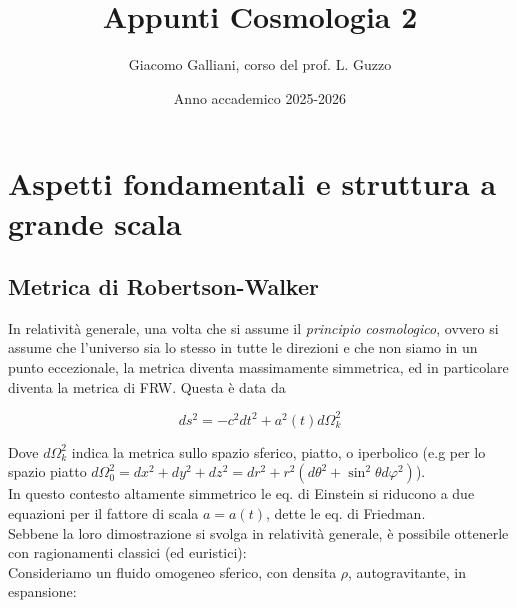 \documentclass{report}
\title{\Huge\textbf{{Appunti Cosmologia 2}}}
\author{Giacomo Galliani, corso del prof. L. Guzzo}
\date{Anno accademico 2025-2026}
\renewcommand{\contentsname}{Indice}
\begin{document}
\maketitle
\newpage%
\pdfbookmark[section]{\contentsname}{toc}
\tableofcontents
\pagebreak

\chapter{Aspetti fondamentali e struttura a grande scala}

\section{Metrica di Robertson-Walker}

In relatività generale, una volta che si assume il \emph{principio cosmologico}, ovvero si assume che l'universo sia lo stesso in tutte le direzioni e che non siamo in un punto eccezionale, la metrica diventa massimamente simmetrica, ed in particolare diventa la metrica di FRW. Questa è data da 

\begin{equation}
    ds^2 = -c^2dt^2 + a^2(t)d\Omega_k^2
\end{equation}

Dove $d\Omega_k^2$ indica la metrica sullo spazio sferico, piatto, o iperbolico (e.g per lo spazio piatto $d\Omega_0^2= dx^2 + dy^2 + dz^2 = dr^2 + r^2(d\theta^2 + \sin^2\theta d\varphi^2)$). \\
In questo contesto altamente simmetrico le eq. di Einstein si riducono a due equazioni per il fattore di scala $a = a(t)$, dette le eq. di Friedman. \\
Sebbene la loro dimostrazione si svolga in relatività generale, è possibile ottenerle con ragionamenti classici (ed euristici): \\
Consideriamo un fluido omogeneo sferico, con densita $\rho$, autogravitante, in espansione: \\
\end{document}
